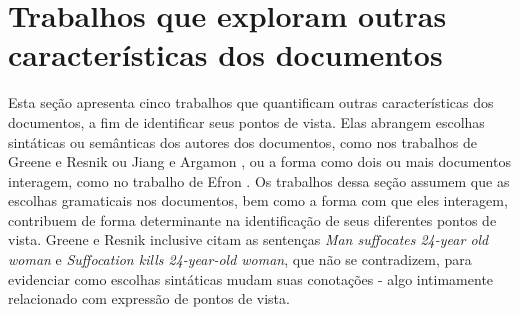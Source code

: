 









\section{Trabalhos que exploram outras características dos documentos}
\label{sintaxe}

Esta seção apresenta cinco trabalhos que quantificam outras características dos documentos, a fim de identificar seus pontos de vista. Elas abrangem escolhas sintáticas ou semânticas dos autores dos documentos, como nos trabalhos de Greene e Resnik \cite{resnik} ou Jiang e Argamon \cite{jiang-argamon}, ou a forma como dois ou mais documentos interagem, como no trabalho de Efron \cite{efron}. Os trabalhos dessa seção assumem que as escolhas gramaticais nos documentos, bem como a forma com que eles interagem, contribuem de forma determinante na identificação de seus diferentes pontos de vista. Greene e Resnik inclusive citam as sentenças \emph{Man suffocates 24-year old woman} e \emph{Suffocation kills 24-year-old woman}, que não se contradizem, para evidenciar como escolhas sintáticas mudam suas conotações \cite{greene} - algo intimamente relacionado com expressão de pontos de vista.


